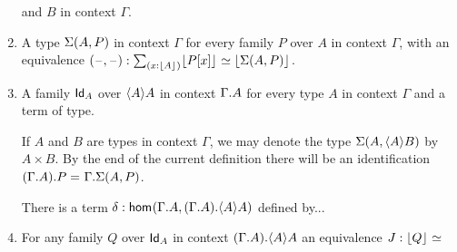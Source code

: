 \begin{defn}
\begin{enumerate}
and $B$ in context $\Gamma$.
\item A type $\Sigma(A,P)$ in context $\Gamma$ for every family $P$ over $A$
in context $\Gamma$, with an equivalence $\pairr{\blank,\blank}:\eqv{\sm{x:\terms{A}}\terms{\subst{x}{P}}}
{\terms{\msm{A}{P}}}$.
\item A family $\mathsf{Id}_{A}$ over $\ctxwk{A}{A}$ in context $\ctxext{\Gamma}{A}$ for
every type $A$ in context $\Gamma$ and a term of type.
\begin{rmk}
If $A$ and $B$ are types in context $\Gamma$, we may denote the type 
$\msm{A}{\ctxwk{A}{B}}$ by $A\times B$. By the end of the current definition
there will be an identification $\id{\ctxext{{\Gamma}{A}}{P}}
{\ctxext{\Gamma}{\msm{A}{P}}}$.

There is a term $\delta:\ctxhom{\ctxext{\Gamma}{A}}{\ctxext{{\Gamma}{A}}{\ctxwk{A}{A}}}$
defined by...
\end{rmk}
\item For any family $Q$ over $\mathsf{Id}_{A}$ in context $\ctxext{{\Gamma}{A}}{\ctxwk{A}{A}}$ an equivalence
$J:\lfloor Q \rfloor^{} \simeq $
\end{enumerate}
\end{defn}

\begingroup
\color{blue}
